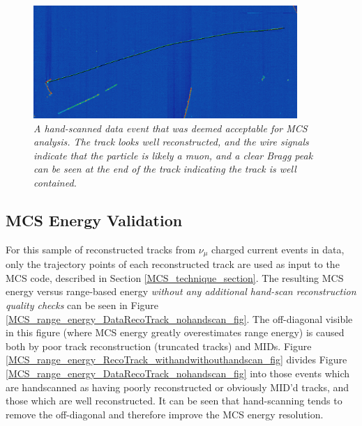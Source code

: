 \begin{figure}[h!]
\begin{center}
\includegraphics[width=100mm]{Figures/good_evd_1.png}
\end{center}
\caption{\textit{A hand-scanned data event that was deemed acceptable for MCS analysis. The track looks well reconstructed, and the wire signals indicate that the particle is likely a muon, and a clear Bragg peak can be seen at the end of the track indicating the track is well contained.}}
\label{good_evd_fig_1}
\end{figure}

\subsection{MCS Energy Validation}\label{MCS_Energy_Validation_DataRecoTrack_section}
For this sample of reconstructed tracks from $\nu_\mu$ charged current events in data, only the trajectory points of each reconstructed track are used as input to the MCS code, described in Section \ref{MCS_technique_section}. The resulting MCS energy versus range-based energy \textit{without any additional hand-scan reconstruction quality checks} can be seen in Figure \ref{MCS_range_energy_DataRecoTrack_nohandscan_fig}. The off-diagonal visible in this figure (where MCS energy greatly overestimates range energy) is caused both by poor track reconstruction (truncated tracks) and MIDs. Figure \ref{MCS_range_energy_RecoTrack_withandwithouthandscan_fig} divides Figure \ref{MCS_range_energy_DataRecoTrack_nohandscan_fig} into those events which are handscanned as having poorly reconstructed or obviously MID'd tracks, and those which are well reconstructed. It can be seen that hand-scanning tends to remove the off-diagonal and therefore improve the MCS energy resolution.\\

